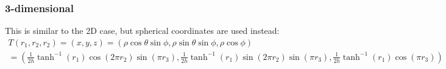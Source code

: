 \documentclass[10pt]{report}
\begin{document}
\subsubsection{3-dimensional}
This is similar to the 2D case, but spherical coordinates are used instead:
\begin{multline}T(r_1,r_2,r_2)=(x,y,z)=(\rho\cos\theta\sin\phi,\rho\sin\theta\sin\phi,\rho\cos\phi)\\=\left(\tfrac{1}{2h}\tanh^{-1}(r_1)\cos(2\pi r_2)\sin(\pi r_3),\tfrac{1}{2h}\tanh^{-1}(r_1)\sin(2\pi r_2)\sin(\pi r_3),\tfrac{1}{2h}\tanh^{-1}(r_1)\cos(\pi r_3)\right)\end{multline}
\end{document}
